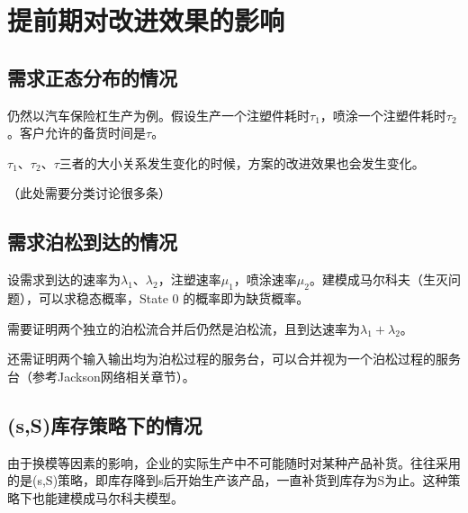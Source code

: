
\chapter{提前期对改进效果的影响}

\section{需求正态分布的情况}

仍然以汽车保险杠生产为例。假设生产一个注塑件耗时$\tau_1$，喷涂一个注塑件耗时$\tau_2$。客户允许的备货时间是$\tau$。

$\tau_1$、$\tau_2$、$\tau$三者的大小关系发生变化的时候，方案的改进效果也会发生变化。

（此处需要分类讨论很多条）



\section{需求泊松到达的情况}

设需求到达的速率为$\lambda_1$、$\lambda_2$，注塑速率$\mu_1$，喷涂速率$\mu_2$。建模成马尔科夫（生灭问题），可以求稳态概率，State 0 的概率即为缺货概率。

需要证明两个独立的泊松流合并后仍然是泊松流，且到达速率为$\lambda_1+\lambda_2$。

还需证明两个输入输出均为泊松过程的服务台，可以合并视为一个泊松过程的服务台（参考Jackson网络相关章节）。





\section{(s,S)库存策略下的情况}

由于换模等因素的影响，企业的实际生产中不可能随时对某种产品补货。往往采用的是(s,S)策略，即库存降到s后开始生产该产品，一直补货到库存为S为止。这种策略下也能建模成马尔科夫模型。



